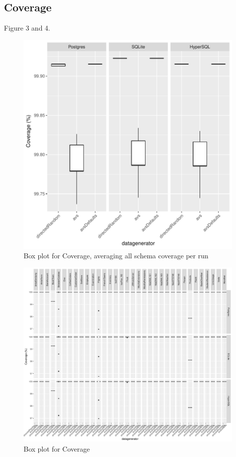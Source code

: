 \documentclass[runningheads,a4paper]{llncs}
\begin{document}
\subsection{Coverage}\label{coverage-1}

Figure 3 and 4.

\begin{figure}[h]
	\centering
	\includegraphics[width=\linewidth]{../plots/figure23.pdf}
	\caption{Box plot for Coverage, averaging all schema coverage per run}
\end{figure}

\begin{figure}[h]
\centering
\includegraphics[width=\linewidth]{../plots/figure22.pdf}
\caption{Box plot for Coverage}
\end{figure}
\end{document}
